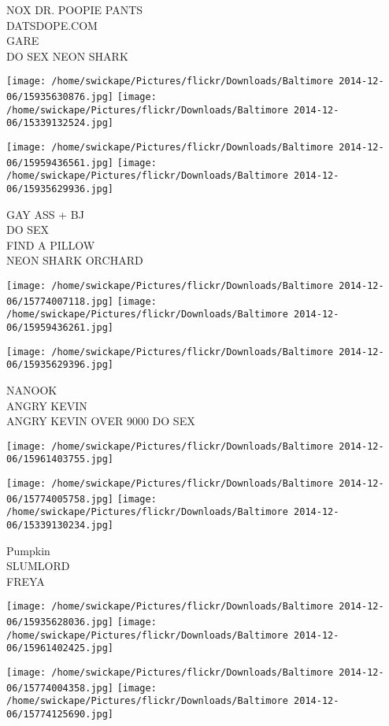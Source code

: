 \documentclass[10pt,letterpaper]{article}
\begin{document}
NOX DR. POOPIE PANTS\\
DATSDOPE.COM\\
GARE\\
DO SEX NEON SHARK
\pagebreak

\texttt{[image: /home/swickape/Pictures/flickr/Downloads/Baltimore 2014-12-06/15935630876.jpg]}
\texttt{[image: /home/swickape/Pictures/flickr/Downloads/Baltimore 2014-12-06/15339132524.jpg]}

\texttt{[image: /home/swickape/Pictures/flickr/Downloads/Baltimore 2014-12-06/15959436561.jpg]}
\texttt{[image: /home/swickape/Pictures/flickr/Downloads/Baltimore 2014-12-06/15935629936.jpg]}

GAY ASS + BJ\\
DO SEX\\
FIND A PILLOW\\
NEON SHARK ORCHARD
\pagebreak

\texttt{[image: /home/swickape/Pictures/flickr/Downloads/Baltimore 2014-12-06/15774007118.jpg]}
\texttt{[image: /home/swickape/Pictures/flickr/Downloads/Baltimore 2014-12-06/15959436261.jpg]}

\texttt{[image: /home/swickape/Pictures/flickr/Downloads/Baltimore 2014-12-06/15935629396.jpg]}

NANOOK\\
ANGRY KEVIN\\
ANGRY KEVIN OVER 9000 DO SEX
\pagebreak

\texttt{[image: /home/swickape/Pictures/flickr/Downloads/Baltimore 2014-12-06/15961403755.jpg]}

\vspace{0.25in}
\texttt{[image: /home/swickape/Pictures/flickr/Downloads/Baltimore 2014-12-06/15774005758.jpg]}
\texttt{[image: /home/swickape/Pictures/flickr/Downloads/Baltimore 2014-12-06/15339130234.jpg]}

Pumpkin\\
SLUMLORD\\
FREYA
\pagebreak

\texttt{[image: /home/swickape/Pictures/flickr/Downloads/Baltimore 2014-12-06/15935628036.jpg]}
\texttt{[image: /home/swickape/Pictures/flickr/Downloads/Baltimore 2014-12-06/15961402425.jpg]}

\texttt{[image: /home/swickape/Pictures/flickr/Downloads/Baltimore 2014-12-06/15774004358.jpg]}
\texttt{[image: /home/swickape/Pictures/flickr/Downloads/Baltimore 2014-12-06/15774125690.jpg]}
\end{document}
